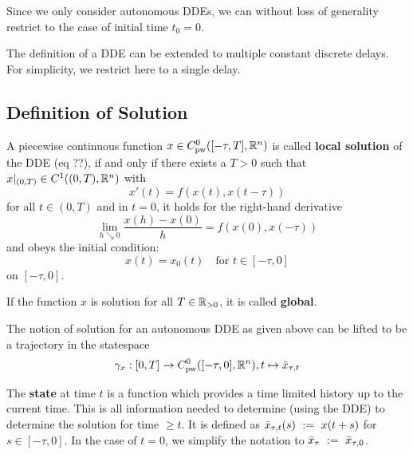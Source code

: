 \documentclass[10pt]{article}
\begin{document}
Since we only consider autonomous DDEs, we can without loss of generality restrict to the case of initial time $t_0=0$.

The definition of a DDE can be extended to multiple constant discrete delays. For simplicity, we restrict here to a single delay.

\subsection{Definition of Solution} \label{sec:definition-of-solution}

\begin{definition}
    \label{definition-solution-dde}

    A piecewise continuous function $x\in C^0_\text{pw}([-\tau,T],\mathbb{R}^n)$ is called \textbf{local solution} of the DDE (eq ??), if and only if there exists a $T>0$ such that $x|_{(0,T)}\in C^1((0,T),\mathbb{R}^n)$ with
    \begin{equation}
        x'(t) = f\left(x(t),x(t-\tau)\right)
    \end{equation}
    for all $t\in (0,T)$ and in $t=0$, it holds for the right-hand derivative \begin{equation}
        \lim_{h\searrow 0}\frac{x(h)-x(0)}{h}=f(x(0),x(-\tau))
    \end{equation}
    and obeys the initial condition:
    \begin{equation}
        x(t) = x_0(t) \quad\text{for } t\in [-\tau,0]
    \end{equation}
    on $[-\tau,0]$.



    If the function $x$ is solution for all $T\in\mathbb{R}_{>0}$, it is called \textbf{global}.

\end{definition}

The notion of solution for an autonomous DDE as given above can be lifted to be a trajectory in the statespace
\begin{equation}
    \gamma_x:[0,T]\rightarrow C^0_\text{pw}([-\tau,0],\mathbb{R}^n),\\ t\mapsto\bar{x}_{\tau,t}
\end{equation}

The \textbf{state} at time $t$ is a function which provides a time limited history up to the current time. This is all information needed to determine (using the DDE) to determine the solution for time $\geq t$. It is defined as $\bar{x}_{\tau,t}(s)~\mathrel{\mathop{:}}=~ x(t+s)$ for $s\in [-\tau,0]$. In the case of $t=0$, we simplify the notation to $\bar{x}_{\tau} ~\mathrel{\mathop{:}}=~ \bar{x}_{\tau,0}$.
\end{document}
